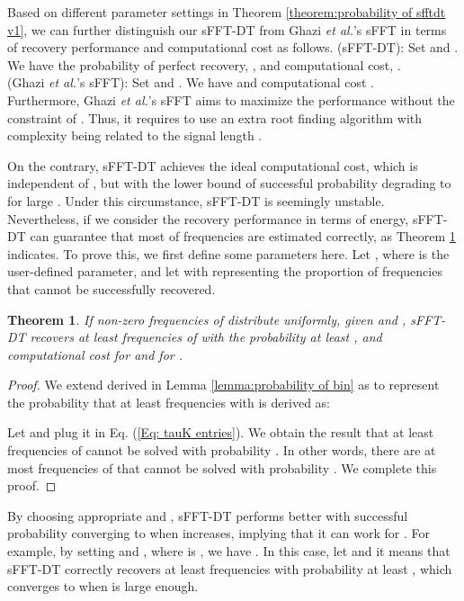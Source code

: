 \documentclass[journal,onecolumn,11pt]{IEEEtran}
\newtheorem{theorem}{Theorem}
\begin{document}
Based on different parameter settings in Theorem \ref{theorem:probability of sfftdt v1}, we can further distinguish our sFFT-DT from Ghazi {\em et al.}'s sFFT \cite{Ghazi2013} in terms of recovery performance and computational cost as follows.
(sFFT-DT): Set  and .
We have the probability of perfect recovery, , and computational cost, .\\
(Ghazi {\em et al.}'s sFFT): Set  and .
We have  and computational cost . \\
Furthermore, Ghazi {\em et al.}'s sFFT aims to maximize the performance without the constraint of .
Thus, it requires to use an extra root finding algorithm \cite{Pan2002} with complexity being related to the signal length .

On the contrary, sFFT-DT achieves the ideal computational cost, which is independent of , but with the lower bound of successful probability degrading to  for large .
Under this circumstance, sFFT-DT is seemingly unstable.
Nevertheless, if we consider the recovery performance in terms of energy, sFFT-DT can guarantee that most of frequencies are estimated correctly, as Theorem \ref{theorem:probability of sfftdt v2} indicates.
To prove this, we first define some parameters here.
Let , where  is the user-defined parameter, and let  with  representing the proportion of frequencies that cannot be successfully recovered.

\begin{theorem}
\label{theorem:probability of sfftdt v2}
If non-zero frequencies of  distribute uniformly, given  and , sFFT-DT recovers at least  frequencies of  with the probability at least , and computational cost  for  and  for .
\end{theorem}
\begin{proof}
We extend  derived in Lemma \ref{lemma:probability of bin} as  to represent the probability that at least  frequencies with  is derived as:

Let  and plug it in Eq. (\ref{Eq: tauK entries}).
We obtain the result that at least  frequencies of  cannot be solved with probability .
In other words, there are at most  frequencies of  that cannot be solved with probability .
We complete this proof.
\end{proof}
By choosing appropriate  and , sFFT-DT performs better with successful probability converging to  when  increases, implying that it can work for .
For example, by setting  and , where  is , we have .
In this case, let  and it means that sFFT-DT correctly recovers at least  frequencies with probability at least , which converges to  when  is large enough.
\end{document}
